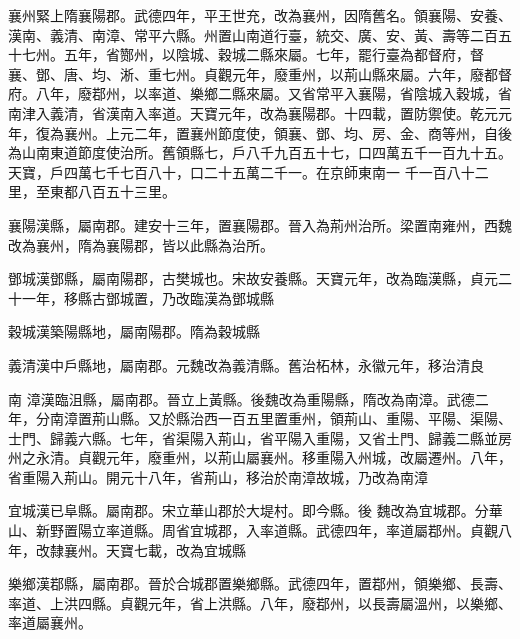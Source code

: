 \begin{pinyinscope}
 襄州緊上隋襄陽郡。武德四年，平王世充，改為襄州，因隋舊名。領襄陽、安養、漢南、義清、南漳、常平六縣。州置山南道行臺，統交、廣、安、黃、壽等二百五十七州。五年，省酂州，以陰城、穀城二縣來屬。七年，罷行臺為都督府，督
 襄、鄧、唐、均、淅、重七州。貞觀元年，廢重州，以荊山縣來屬。六年，廢都督府。八年，廢鄀州，以率道、樂鄉二縣來屬。又省常平入襄陽，省陰城入穀城，省南津入義清，省漢南入率道。天寶元年，改為襄陽郡。十四載，置防禦使。乾元元年，復為襄州。上元二年，置襄州節度使，領襄、鄧、均、房、金、商等州，自後為山南東道節度使治所。舊領縣七，戶八千九百五十七，口四萬五千一百九十五。天寶，戶四萬七千七百八十，口二十五萬二千一。在京師東南一
 千一百八十二里，至東都八百五十三里。



 襄陽漢縣，屬南郡。建安十三年，置襄陽郡。晉入為荊州治所。梁置南雍州，西魏改為襄州，隋為襄陽郡，皆以此縣為治所。



 鄧城漢鄧縣，屬南陽郡，古樊城也。宋故安養縣。天寶元年，改為臨漢縣，貞元二十一年，移縣古鄧城置，乃改臨漢為鄧城縣



 穀城漢築陽縣地，屬南陽郡。隋為穀城縣



 義清漢中戶縣地，屬南郡。元魏改為義清縣。舊治柘林，永徽元年，移治清良



 南
 漳漢臨沮縣，屬南郡。晉立上黃縣。後魏改為重陽縣，隋改為南漳。武德二年，分南漳置荊山縣。又於縣治西一百五里置重州，領荊山、重陽、平陽、渠陽、士門、歸義六縣。七年，省渠陽入荊山，省平陽入重陽，又省土門、歸義二縣並房州之永清。貞觀元年，廢重州，以荊山屬襄州。移重陽入州城，改屬遷州。八年，省重陽入荊山。開元十八年，省荊山，移治於南漳故城，乃改為南漳



 宜城漢已阜縣。屬南郡。宋立華山郡於大堤村。即今縣。後
 魏改為宜城郡。分華山、新野置陽立率道縣。周省宜城郡，入率道縣。武德四年，率道屬鄀州。貞觀八年，改隸襄州。天寶七載，改為宜城縣



 樂鄉漢鄀縣，屬南郡。晉於合城郡置樂鄉縣。武德四年，置鄀州，領樂鄉、長壽、率道、上洪四縣。貞觀元年，省上洪縣。八年，廢鄀州，以長壽屬溫州，以樂鄉、率道屬襄州。




\end{pinyinscope}
